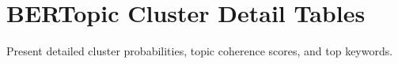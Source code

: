 
\chapter{BERTopic Cluster Detail Tables}
\label{app:bertopic}

Present detailed cluster probabilities, topic coherence scores, and top keywords.

